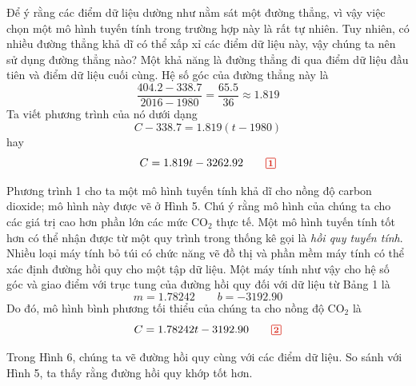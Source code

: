 \begin{minipage}[t]{0.708\textwidth}
    \fontsize{9.3pt}{13.2pt}\selectfont
    Để ý rằng các điểm dữ liệu dường như nằm sát một đường thẳng, vì vậy việc chọn một mô hình tuyến tính trong trường hợp này là rất tự nhiên. Tuy nhiên, có nhiều đường thẳng khả dĩ có thể xấp xỉ các điểm dữ liệu này, vậy chúng ta nên sử dụng đường thẳng nào? Một khả năng là đường thẳng đi qua điểm dữ liệu đầu tiên và điểm dữ liệu cuối cùng. Hệ số góc của đường thẳng này là
    \[
    \frac{404.2 - 338.7}{2016 - 1980} = \frac{65.5}{36} \approx 1.819
    \]
    Ta viết phương trình của nó dưới dạng
    \[
    C - 338.7 = 1.819(t - 1980)
    \]
    hay
    \begin{equation}
        C = 1.819t - 3262.92
        \tag*{\tikz[baseline=(char.base)]{\node[draw=stewartred, inner sep=1.8pt, line width=0.6pt, rounded corners=0.5pt] (char) {\fontsize{8pt}{9pt}\selectfont\bfseries\color{stewartred} 1};}}
    \end{equation}

    Phương trình 1 cho ta một mô hình tuyến tính khả dĩ cho nồng độ carbon dioxide; mô hình này được vẽ ở Hình 5. Chú ý rằng mô hình của chúng ta cho các giá trị cao hơn phần lớn các mức $\text{CO}_2$ thực tế. Một mô hình tuyến tính tốt hơn có thể nhận được từ một quy trình trong thống kê gọi là \textit{hồi quy tuyến tính}. Nhiều loại máy tính bỏ túi có chức năng vẽ đồ thị và phần mềm máy tính có thể xác định đường hồi quy cho một tập dữ liệu. Một máy tính như vậy cho hệ số góc và giao điểm với trục tung của đường hồi quy đối với dữ liệu từ Bảng 1 là
    \[
    m = 1.78242 \qquad b = -3192.90
    \]
    Do đó, mô hình bình phương tối thiểu của chúng ta cho nồng độ $\text{CO}_2$ là
    \begin{equation}
        C = 1.78242t - 3192.90
        \tag*{\tikz[baseline=(char.base)]{\node[draw=stewartred, inner sep=1.8pt, line width=0.6pt, rounded corners=0.5pt] (char) {\fontsize{8pt}{9pt}\selectfont\bfseries\color{stewartred} 2};}}
    \end{equation}

    Trong Hình 6, chúng ta vẽ đường hồi quy cùng với các điểm dữ liệu. So sánh với Hình 5, ta thấy rằng đường hồi quy khớp tốt hơn.

    \vspace{4mm}
    \begin{center}
\end{center}
\end{minipage}
